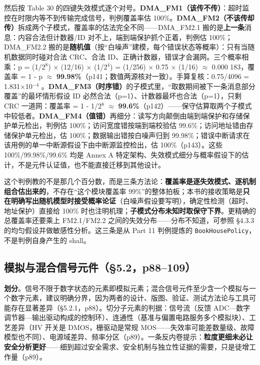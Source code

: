 然后按 Table 30 的四键失效模式逐个对号。\textbf{DMA\_FM1（该传不传）}：超时监控在时限内等不到传输完成信号，判例覆盖率估 100\%。\textbf{DMA\_FM2（不该传却传）}拆成两个子模式，覆盖率的估法完全不同——DMA\_FM2.1 搬的是\textbf{上一条}消息：内容合法但计数器/ID 对不上，端到端保护抓个正着，判例估 100\%；DMA\_FM2.2 搬的是\textbf{随机值}（按“白噪声”建模，每个错误状态等概率）：只有当随机数据同时碰对合法 CRC、合法 ID、正确计数器，错误才会漏网。三个概率相乘：p = (1/2\(^{8}\)) \(\times\) (12/16) \(\times\) (1/2\(^{4}\)) = (1/256) \(\times\) 0.75 \(\times\) (1/16) \(\approx\) 0.000 183，覆盖率 = 1 - p \(\approx\) \textbf{99.98\%}（p141；数值两源核对一致）。手算复核：0.75/4096 = 1.831\(\times\)10\(^{-4}\) \checkmark{}。\textbf{DMA\_FM3（时序错）}的子模式里，“取数期间被下一条消息部分覆盖”的最坏情形假设 ID 必然合法（p=1）、计数器最坏也合法（p=1），只剩 CRC 一道网：覆盖率 = 1 - 1/2\(^{8}\) \(\approx\) \textbf{99.6\%}（p142）——保守估算取两个子模式中较低者。\textbf{DMA\_FM4（值错）}再细分：读写方向颠倒由端到端保护和存储保护单元检出，判例估 100\%；访问宽度错按端到端校验估 99.6\%；访问地址错由存储保护单元检出，估 100\%；数据输出错按白噪声归到 99.98\%；错误中断请求在该用例的单一中断源假设下由中断源监控检出，估 100\%（p143）。这些 100\%/99.98\%/99.6\% 均是 Annex A 特定架构、失效模式细分与概率假设下的估计，不是元件认证值，也不能直接迁移到其他设计。

这个判例教的不是那几个百分数，而是三条方法论：\textbf{覆盖率是逐失效模式、逐机制组合估出来的}，不存在“这个模块覆盖率 99\%”的整体拍板；本书的接收策略是\textbf{只在明确写出随机模型时接受概率论证}（白噪声假设要写明），确定性检测（超时、地址保护）直接给 100\% 时也注明机理；\textbf{子模式分布未知时取保守下界}。更精确的总覆盖率还要乘上 FM2.1/FM2.2 之间的失效分布——分布不知道，可参照 §4.3.3 的均匀假设并做敏感性分析。这三条是从 Part 11 判例提炼的 \nolinkurl{BookHousePolicy}，不是判例自身产生的 shall。

\subsection{模拟与混合信号元件（§5.2，p88–109）}

\textbf{划分}。信号不限于数字状态的元素即模拟元素；混合信号元件至少含一个模拟与一个数字元素，建议明确分界，因为两者的设计、版图、验证、测试方法论与工具可能存在显著差异（§5.2.1，p88）。切分子元素的判据：信号流（反馈 ADC—数字调节器—输出驱动构成的控制环）、连通性（基准与偏置电路服务多个模拟块）、工艺差异（HV 开关是 DMOS，栅驱动是常规 MOS——失效率可能差数量级、故障模型也不同）、电源域差异、频率分区（p89）。一条反内卷提示：\textbf{粒度更细未必让安全分析更好}——细到超过安全需求、安全机制与独立性证据的需要，只是徒增工作量（p89）。

